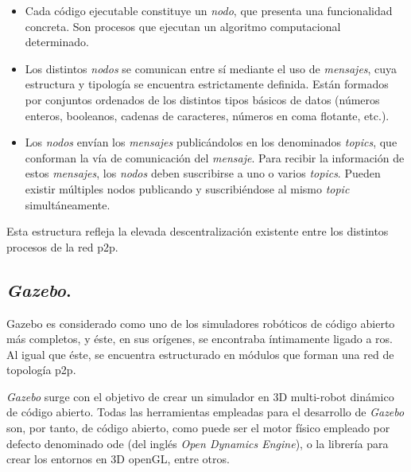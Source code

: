 \begin{itemize}

\item Cada código ejecutable constituye un \emph{nodo}, que presenta una funcionalidad concreta. Son procesos que ejecutan un algoritmo computacional determinado. \par 

\item Los distintos \emph{nodos} se comunican entre sí mediante el uso de \emph{mensajes}, cuya estructura y tipología se encuentra estrictamente definida. Están formados por conjuntos ordenados de los distintos tipos básicos de datos (números enteros, booleanos, cadenas de caracteres, números en coma flotante, etc.). \par 

\item Los \emph{nodos} envían los \emph{mensajes} publicándolos en los denominados \emph{topics}, que conforman la vía de comunicación del \emph{mensaje}. Para recibir la información de estos \emph{mensajes}, los \emph{nodos} deben suscribirse a uno o varios \emph{topics}. Pueden existir múltiples nodos publicando y suscribiéndose al mismo \emph{topic} simultáneamente. \par 

\end{itemize}

Esta estructura refleja la elevada descentralización existente entre los distintos procesos de la red \acrlong{p2p}.

\subsection{\textit{Gazebo}.}

Gazebo es considerado como uno de los simuladores robóticos de código abierto más completos, y éste, en sus orígenes, se encontraba íntimamente ligado a \acrshort{ros}. Al igual que éste, se encuentra estructurado en módulos que forman una red de topología \acrlong{p2p}. \par 

\emph{Gazebo} surge con el objetivo de crear un simulador en 3D multi-robot dinámico de código abierto. Todas las herramientas empleadas para el desarrollo de \emph{Gazebo} son, por tanto, de código abierto, como puede ser el motor físico empleado por defecto denominado \acrshort{ode} (del inglés \emph{Open Dynamics Engine}), o la librería para crear los entornos en 3D openGL, entre otros. \par 

